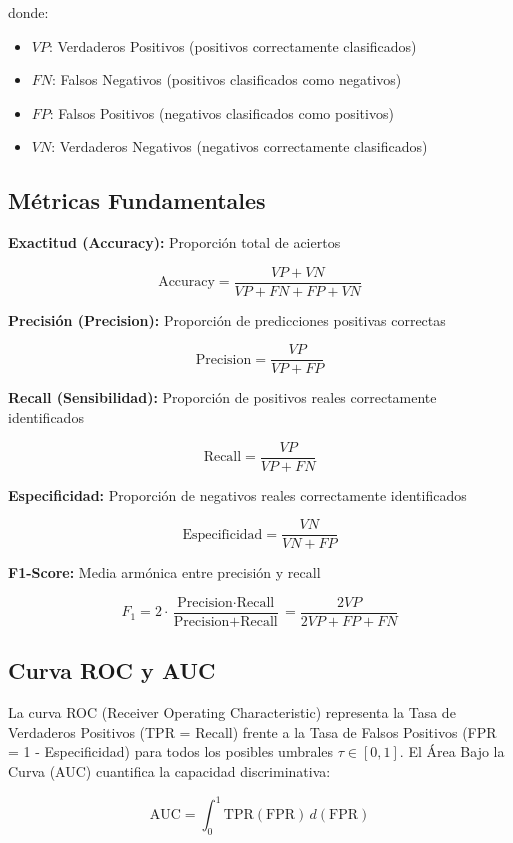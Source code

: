 \documentclass[12pt]{article}
\begin{document}
donde:
\begin{itemize}
\item $VP$: Verdaderos Positivos (positivos correctamente clasificados)
\item $FN$: Falsos Negativos (positivos clasificados como negativos)
\item $FP$: Falsos Positivos (negativos clasificados como positivos)
\item $VN$: Verdaderos Negativos (negativos correctamente clasificados)
\end{itemize}

\subsection{Métricas Fundamentales}

\textbf{Exactitud (Accuracy):} Proporción total de aciertos

\[
\text{Accuracy} = \frac{VP + VN}{VP + FN + FP + VN}
\]

\textbf{Precisión (Precision):} Proporción de predicciones positivas correctas

\[
\text{Precision} = \frac{VP}{VP + FP}
\]

\textbf{Recall (Sensibilidad):} Proporción de positivos reales correctamente identificados

\[
\text{Recall} = \frac{VP}{VP + FN}
\]

\textbf{Especificidad:} Proporción de negativos reales correctamente identificados

\[
\text{Especificidad} = \frac{VN}{VN + FP}
\]

\textbf{F1-Score:} Media armónica entre precisión y recall

\[
F_1 = 2 \cdot \frac{\text{Precision} \cdot \text{Recall}}{\text{Precision} + \text{Recall}} = \frac{2VP}{2VP + FP + FN}
\]

\subsection{Curva ROC y AUC}

La curva ROC (Receiver Operating Characteristic) representa la Tasa de Verdaderos Positivos (TPR = Recall) frente a la Tasa de Falsos Positivos (FPR = 1 - Especificidad) para todos los posibles umbrales $\tau \in [0,1]$. El Área Bajo la Curva (AUC) cuantifica la capacidad discriminativa:

\[
\text{AUC} = \int_0^1 \text{TPR}(\text{FPR}) \, d(\text{FPR})
\]
\end{document}
